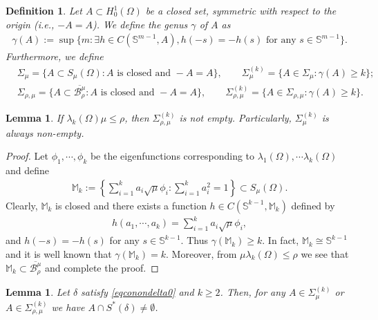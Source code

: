\documentclass[10pt,a4paper]{article}
\newtheorem{definition}[theorem]{Definition}
\newtheorem{lemma}[theorem]{Lemma}
\theoremstyle{definition} \theoremstyle{remark}
\numberwithin{equation}{section}
\newcommand{\B}{\mathcal{B}}
\newcommand{\s}{\mathbb{S}}
\newcommand{\la}{\lambda}
\newcommand{\ga}{\gamma}
\begin{document}
\begin{definition} \label{defgenus}
	Let $A \subset H_0^1(\Omega)$ be a closed set, symmetric with respect to the origin (i.e., $-A = A$). We define the genus $\ga$ of $A$ as
	\begin{align*}
		\ga(A) := \sup\bigl\{ m : \exists h \in C(\s^{m-1},A), h(-s) = -h(s) \text{ for any } s \in \s^{m-1} \bigr\}.
	\end{align*}
	Furthermore, we define
	\begin{align*}
		& \Sigma_{\mu} = \bigl\{A \subset S_\mu(\Omega): A \text{ is closed and } -A = A\bigr\}, \quad \quad \Sigma_{\mu}^{(k)} = \bigl\{A \in \Sigma_{\mu}: \ga(A) \geq k\bigr\}; \\
		& \Sigma_{\rho,\mu} = \bigl\{A \subset \overline{\B_\rho^\mu}: A \text{ is closed and } -A = A\bigr\}, \quad \quad \Sigma_{\rho,\mu}^{(k)} = \bigl\{A \in \Sigma_{\rho,\mu}: \ga(A) \geq k\bigr\}.
	\end{align*}
\end{definition}

\begin{lemma} \label{lemsigmanotempty}
	If $\la_k(\Omega) \mu \leq \rho$, then $\Sigma_{\rho,\mu}^{(k)}$ is not empty. Particularly, $\Sigma_{\mu}^{(k)}$ is always non-empty.
\end{lemma}

\begin{proof}
	Let $\phi_1, \cdots, \phi_k$ be the eigenfunctions corresponding to $\la_1(\Omega), \cdots \la_k(\Omega)$ and define
	\begin{align} \label{eqdefMk}
		\mathbb{M}_k := \left\{\sum_{i=1}^ka_i\sqrt{\mu}\phi_i: \sum_{i=1}^ka_i^2 = 1\right\} \subset S_\mu(\Omega).
	\end{align}
    Clearly, $\mathbb{M}_k$ is closed and there exists a function $h \in C(\s^{k-1},\mathbb{M}_k)$ defined by
    \begin{align*}
    	h(a_1,\cdots,a_k) = \sum_{i=1}^ka_i\sqrt{\mu}\phi_i,
    \end{align*}
    and $h(-s) = -h(s)$ for any $s \in \s^{k-1}$. Thus $\ga(\mathbb{M}_k) \geq k$. In fact, $\mathbb{M}_k \cong \s^{k-1}$ and it is well known that $\ga(\mathbb{M}_k) = k$. Moreover, from $\mu \la_k(\Omega) \leq \rho$ we see that $\mathbb{M}_k \subset \overline{\B_\rho^\mu}$ and complete the proof.
\end{proof}

\begin{lemma} \label{lemAcapSnotemp}
	Let $\delta$ satisfy \eqref{eqconondelta0} and $k \geq 2$. Then, for any $A \in \Sigma_{\mu}^{(k)}$ or $A \in \Sigma_{\rho,\mu}^{(k)}$ we have $A \cap S^*(\delta) \neq \emptyset$.
\end{lemma}
\end{document}

